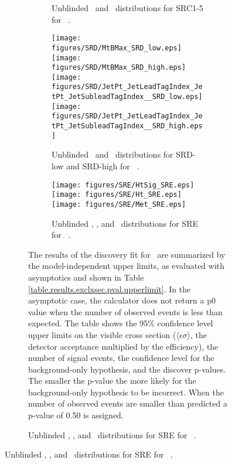 \begin{figure}[htbp]
\begin{center}
\begin{figure}[htbp]
\begin{center}
{{{\begin{figure}[!hp] 
\begin{center}
\caption{Unblinded \rISR\ and \pTISR\ distributions for SRC1-5 for \intlumi\ \ifb.}
\label{fig:SRCunblinded}
\end{center}
\end{figure}


\begin{figure}[!hp] 
\begin{center}
\texttt{[image: figures/SRD/MtBMax\_SRD\_low.eps]}
\texttt{[image: figures/SRD/MtBMax\_SRD\_high.eps]}
\texttt{[image: figures/SRD/JetPt\_JetLeadTagIndex\_JetPt\_JetSubleadTagIndex\_\_SRD\_low.eps]}
\texttt{[image: figures/SRD/JetPt\_JetLeadTagIndex\_JetPt\_JetSubleadTagIndex\_\_SRD\_high.eps]}

\caption{Unblinded \mtbmax\ and \ptone\ distributions for SRD-low and SRD-high for \intlumi\ \ifb.}
\label{fig:SRDunblinded}
\end{center}
\end{figure}


\begin{figure}[!hp] 
\begin{center}
\texttt{[image: figures/SRE/HtSig\_SRE.eps]}
\texttt{[image: figures/SRE/Ht\_SRE.eps]}
\texttt{[image: figures/SRE/Met\_SRE.eps]}
\caption{Unblinded \htsig, \HT, and \met\ distributions for SRE for \intlumi\ \ifb.}
\label{fig:SREunblinded}
\end{center}
\end{figure}

The results of the discovery fit for \intlumi\ \ifb are summarized by the
model-independent upper limits, as evaluated with asymptotics
and shown in Table \ref{table.results.exclxsec.pval.upperlimit}. In the asymptotic case, the calculator does not return a p0 value when the number of observed events is less than expected.  The table shows the 95\% confidence level upper limits on the visible cross section ($\langle \epsilon \sigma \rangle$, the detector acceptance multiplied by the efficiency), the number of signal events, the confidence level for the background-only hypothesis, and the discover p-values.  The smaller the p-value the more likely for the background-only hypothesis to be incorrect.  When the number of observed events are smaller than predicted a p-value of 0.50 is assigned.  \\

}}}
\end{center}
\end{figure}
\end{center}
\end{figure}
